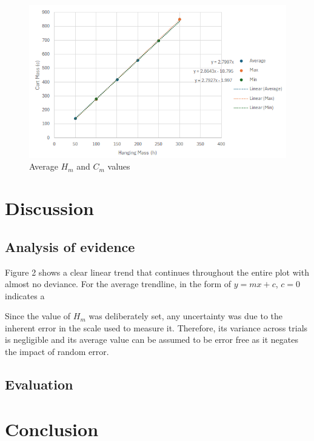 \documentclass[11pt,a4paper]{article}
\begin{document}
\begin{figure}[H]
\centering
\includegraphics[width=0.8\paperwidth]{results.png}
\caption{Average $H_m$ and $C_m$ values}
\end{figure}




\section{Discussion}
\subsection{Analysis of evidence}
Figure 2 shows a clear linear trend that continues throughout the entire plot with almost no deviance. For the average trendline, in the form of $y=mx+c$, $c=0$ indicates a 


Since the value of $H_m$ was deliberately set, any uncertainty was due to the inherent error in the scale used to measure it. Therefore, its variance across trials is negligible and its average value can be assumed to be error free as it negates the impact of random error.
\subsection{Evaluation}


\section{Conclusion}
\newpage



	
\end{document}
